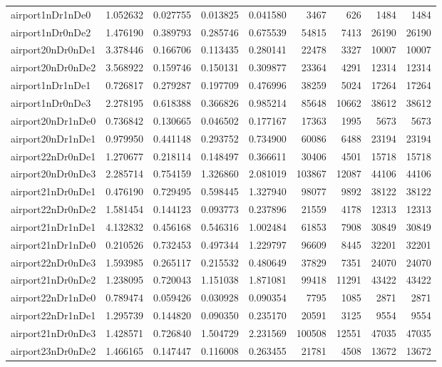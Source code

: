 \documentclass[../../../thesis.tex]{subfiles}
\begin{document}
\begin{longtable}{|l|r|r|r|r|r|r|r|r|}
airport1nDr1nDe0 & 1.052632 & 0.027755 & 0.013825 & 0.041580 & 3467 & 626 & 1484 & 1484 \\
airport1nDr0nDe2 & 1.476190 & 0.389793 & 0.285746 & 0.675539 & 54815 & 7413 & 26190 & 26190 \\
airport20nDr0nDe1 & 3.378446 & 0.166706 & 0.113435 & 0.280141 & 22478 & 3327 & 10007 & 10007 \\
airport20nDr0nDe2 & 3.568922 & 0.159746 & 0.150131 & 0.309877 & 23364 & 4291 & 12314 & 12314 \\
airport1nDr1nDe1 & 0.726817 & 0.279287 & 0.197709 & 0.476996 & 38259 & 5024 & 17264 & 17264 \\
airport1nDr0nDe3 & 2.278195 & 0.618388 & 0.366826 & 0.985214 & 85648 & 10662 & 38612 & 38612 \\
airport20nDr1nDe0 & 0.736842 & 0.130665 & 0.046502 & 0.177167 & 17363 & 1995 & 5673 & 5673 \\
airport20nDr1nDe1 & 0.979950 & 0.441148 & 0.293752 & 0.734900 & 60086 & 6488 & 23194 & 23194 \\
airport22nDr0nDe1 & 1.270677 & 0.218114 & 0.148497 & 0.366611 & 30406 & 4501 & 15718 & 15718 \\
airport20nDr0nDe3 & 2.285714 & 0.754159 & 1.326860 & 2.081019 & 103867 & 12087 & 44106 & 44106 \\
airport21nDr0nDe1 & 0.476190 & 0.729495 & 0.598445 & 1.327940 & 98077 & 9892 & 38122 & 38122 \\
airport22nDr0nDe2 & 1.581454 & 0.144123 & 0.093773 & 0.237896 & 21559 & 4178 & 12313 & 12313 \\
airport21nDr1nDe1 & 4.132832 & 0.456168 & 0.546316 & 1.002484 & 61853 & 7908 & 30849 & 30849 \\
airport21nDr1nDe0 & 0.210526 & 0.732453 & 0.497344 & 1.229797 & 96609 & 8445 & 32201 & 32201 \\
airport22nDr0nDe3 & 1.593985 & 0.265117 & 0.215532 & 0.480649 & 37829 & 7351 & 24070 & 24070 \\
airport21nDr0nDe2 & 1.238095 & 0.720043 & 1.151038 & 1.871081 & 99418 & 11291 & 43422 & 43422 \\
airport22nDr1nDe0 & 0.789474 & 0.059426 & 0.030928 & 0.090354 & 7795 & 1085 & 2871 & 2871 \\
airport22nDr1nDe1 & 1.295739 & 0.144820 & 0.090350 & 0.235170 & 20591 & 3125 & 9554 & 9554 \\
airport21nDr0nDe3 & 1.428571 & 0.726840 & 1.504729 & 2.231569 & 100508 & 12551 & 47035 & 47035 \\
airport23nDr0nDe2 & 1.466165 & 0.147447 & 0.116008 & 0.263455 & 21781 & 4508 & 13672 & 13672 \\

\end{longtable}
\end{document}
